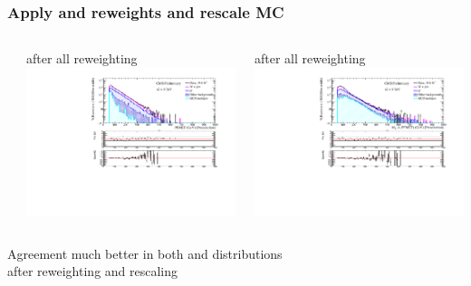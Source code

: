\documentclass[bigger]{beamer}
\begin{document}
\begin{frame}
\frametitle{Apply \met and \mt reweights and rescale MC}
\label{sec-1-9-9}
\begin{columns} %
\label{sec-1-9-9-1}
\begin{column}{0.6\textwidth}
\label{sec-1-9-9-1-1}

\centering
\met after all reweighting
\includegraphics[width=\textwidth]{fig/enu/reweight/MET_PAS_enujjMETandMTReweighted.pdf}
\end{column}
\begin{column}{0.6\textwidth}
\label{sec-1-9-9-1-2}

\centering
\mt after all reweighting
\includegraphics[width=\textwidth]{fig/enu/reweight/MTenu_PAS_enujjMETandMTReweighted.pdf}
\end{column}
\end{columns}
\label{sec-1-9-9-2}

\small
\centering
Agreement much better in both \met and \mt distributions \\
after reweighting and rescaling
\end{frame}
\end{document}
